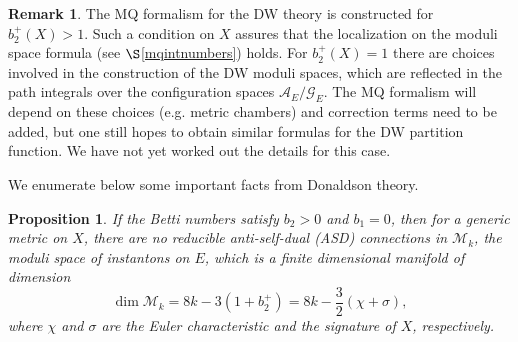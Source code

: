 \documentclass[a4paper,12pt,reqno,sumlimits]{amsart}
\theoremstyle{plain}
\newtheorem{prop}[thm]{Proposition}
\theoremstyle{definition}
\newtheorem{rem}[thm]{Remark}
\newcommand{\1}{{\bf 1}}
\newcommand{\calA}{{\mathcal A}}
\newcommand{\calG}{{\mathcal G}}
\newcommand{\calM}{{\mathcal M}}
\numberwithin{equation}{section}
\begin{document}
\begin{rem}
  The MQ formalism for the DW theory is constructed for $b_2^+(X)>1$. Such a
  condition on $X$ assures that the localization on the moduli space formula
  (see $\S$\ref{mqintnumbers}) holds. For $b_2^+(X)=1$ there are choices
  involved in the construction of the DW moduli spaces, which are reflected
  in the path integrals over the configuration spaces $\calA_E/\calG_E$.  The
  MQ formalism will depend on these choices (e.g. metric chambers) and
  correction terms need to be added, but one still hopes to obtain similar
  formulas for the DW partition function.  We have not yet worked out the
  details for this case.
\end{rem}
We enumerate below some important facts from Donaldson theory. 
\begin{prop}
  \label{propdimD}
  If the Betti numbers satisfy $b_2>0$ and $b_1=0$, then for a generic metric
  on $X$, there are no reducible anti-self-dual (ASD) connections in
  $\calM_k$, the moduli space of instantons on $E$, which is a finite
  dimensional manifold of dimension
  $$
  \dim{\calM_k}=8k-3(1+b_2^+)=8k-\frac{3}{2}(\chi+\sigma),
  $$
  where $\chi$ and $\sigma$ are the Euler characteristic and the
  signature of $X$, respectively.
\end{prop}
\end{document}
